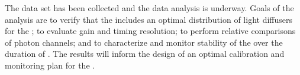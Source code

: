 The  data set has been collected and the data analysis is underway.
Goals of the analysis are to verify that the  includes %
an optimal distribution of light diffusers for the ;  %
to evaluate gain and timing resolution; to perform relative comparisons of photon channels;
and to characterize and monitor stability of the  over the duration of . The results will inform the design of an optimal
 calibration and monitoring plan for the .%








%
